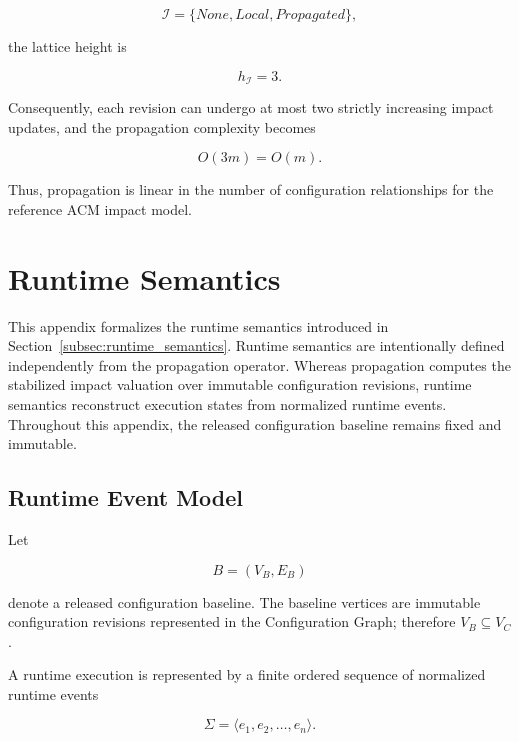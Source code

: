 \documentclass[10pt]{article}
\begin{document}
\[
\mathcal I
=
\{
None,
Local,
Propagated
\},
\]

the lattice height is

\[
h_{\mathcal I}=3.
\]

Consequently, each revision can undergo at most two strictly increasing impact updates, and the propagation complexity becomes

\begin{equation}
	\label{eq:worklist_complexity_acm}
	O(3m)
	=
	O(m).
\end{equation}

Thus, propagation is linear in the number of configuration relationships for the reference ACM impact model.

\section{Runtime Semantics}
\label{appendix:runtime_semantics}

This appendix formalizes the runtime semantics introduced in
Section~\ref{subsec:runtime_semantics}. Runtime semantics are intentionally defined independently from the propagation operator. Whereas propagation computes the stabilized impact valuation over immutable configuration revisions, runtime semantics reconstruct execution states from normalized runtime events. Throughout this appendix, the released configuration baseline remains fixed and immutable.

\subsection{Runtime Event Model}
\label{appendix:runtime_event_model}

Let

\[
B=(V_B,E_B)
\]

denote a released configuration baseline.
The baseline vertices are immutable configuration revisions represented in the
Configuration Graph; therefore $V_B\subseteq V_C$.

A runtime execution is represented by a finite ordered sequence of normalized runtime events

\begin{equation}
\Sigma
=
\langle
e_1,e_2,\ldots,e_n
\rangle.
\label{eq:runtime_e1_e2}
\end{equation}
\end{document}

